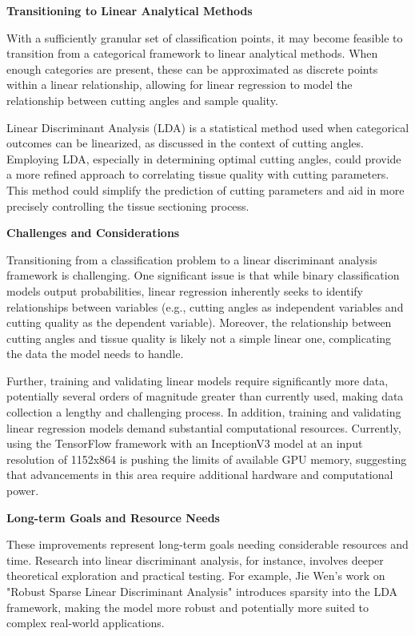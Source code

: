 \textbf{Transitioning to Linear Analytical Methods}

With a sufficiently granular set of classification points, it may become feasible to transition from a categorical framework to linear analytical methods. When enough categories are present, these can be approximated as discrete points within a linear relationship, allowing for linear regression to model the relationship between cutting angles and sample quality.

Linear Discriminant Analysis (LDA) is a statistical method used when categorical outcomes can be linearized, as discussed in the context of cutting angles. Employing LDA, especially in determining optimal cutting angles, could provide a more refined approach to correlating tissue quality with cutting parameters. This method could simplify the prediction of cutting parameters and aid in more precisely controlling the tissue sectioning process.

\textbf{Challenges and Considerations}

Transitioning from a classification problem to a linear discriminant analysis framework is challenging. One significant issue is that while binary classification models output probabilities, linear regression inherently seeks to identify relationships between variables (e.g., cutting angles as independent variables and cutting quality as the dependent variable). Moreover, the relationship between cutting angles and tissue quality is likely not a simple linear one, complicating the data the model needs to handle.

Further, training and validating linear models require significantly more data, potentially several orders of magnitude greater than currently used, making data collection a lengthy and challenging process. In addition, training and validating linear regression models demand substantial computational resources. Currently, using the TensorFlow framework with an InceptionV3 model at an input resolution of 1152x864 is pushing the limits of available GPU memory, suggesting that advancements in this area require additional hardware and computational power.

\textbf{Long-term Goals and Resource Needs}

These improvements represent long-term goals needing considerable resources and time. Research into linear discriminant analysis, for instance, involves deeper theoretical exploration and practical testing. For example, Jie Wen's work on "Robust Sparse Linear Discriminant Analysis" introduces sparsity into the LDA framework, making the model more robust and potentially more suited to complex real-world applications\cite{6.1}.


